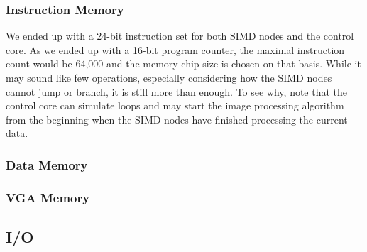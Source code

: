 \subsubsection*{Instruction Memory}
We ended up with a 24-bit instruction set for both \ac{SIMD} nodes and the
control core. As we ended up with a 16-bit program counter, the maximal
instruction count would be 64,000 and the memory chip size is chosen on that
basis. While it may sound like few operations, especially considering how the
\ac{SIMD} nodes cannot jump or branch, it is still more than enough. To see why,
note that the control core can simulate loops and may start the image processing
algorithm from the beginning when the \ac{SIMD} nodes have finished processing
the current data.

\subsubsection*{Data Memory}

\subsubsection*{VGA Memory}

\subsection{I/O}

